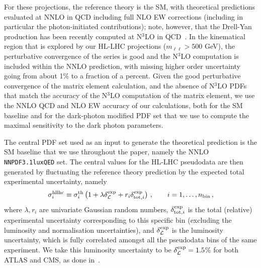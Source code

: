 \documentclass[withindex,glossary]{cam-thesis}
\begin{document}
For these projections, the reference theory is the SM, with
theoretical predictions evaluated at NNLO in QCD including full 
NLO EW corrections (including in particular the photon-initiated
contributions); note, however, that the Drell-Yan production has been recently computed at
N${}^3$LO in QCD~\cite{Duhr:2020seh,Duhr:2021vwj}. In the kinematical
region that is explored by our HL-LHC projections ($m_{\ell\ell}>500$
GeV), the perturbative convergence of the series is good and
the N${}^3$LO computation is included within the NNLO prediction, with
missing higher order uncertainty going from about 1\% to a fraction of
a percent. Given the good perturbative convergence of
the matrix element calculation, and the absence of N${}^3$LO PDFs that match
the accuracy of the N${}^3$LO computation of the matrix element, we use the NNLO QCD and NLO EW accuracy of our calculations, both for the SM
baseline and for the dark-photon modified PDF set that we use to
compute the maximal sensitivity to the dark photon parameters. 

The central PDF set used as an input to generate the theoretical prediction is the SM baseline
that we use throughout the paper, namely the NNLO {\tt NNPDF3.1luxQED} set.
The central values for the HL-LHC pseudodata are then generated
by fluctuating the reference theory prediction by the expected total experimental
uncertainty, namely
\begin{equation}
  \label{eq:hllhc}
\sigma^{\rm hllhc}_{i} \equiv \sigma^{\rm th}_{i} \left( 1+ \lambda
  \delta_{\cal L}^{\rm exp} +  r_i\delta_{{\rm tot},i}^{\rm exp}   \right) \, , \qquad i=1,\ldots,n_{\rm bin} \, ,
\end{equation}
where $\lambda,r_i$ are univariate Gaussian random numbers, $\delta_{{\rm tot},i}^{\rm exp}$
is the total (relative) experimental uncertainty corresponding to this
specific bin
(excluding the luminosity and normalisation uncertainties), and $\delta_{\cal L}^{\rm exp}$
is the luminosity uncertainty, which is fully correlated amongst all
the pseudodata bins of the same experiment. We take this luminosity uncertainty to be
$\delta_{\cal L}^{\rm exp}=1.5$\%  for both ATLAS and CMS, as done in~\cite{Khalek:2018}.
\end{document}

